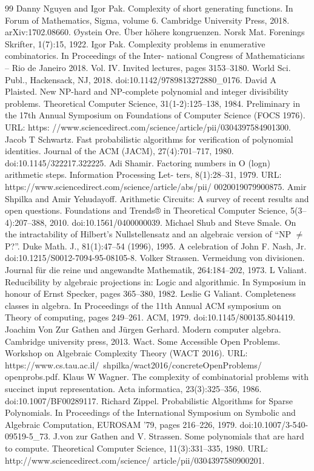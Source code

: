\documentclass[10pt,a4paper]{article}
\begin{document}
\begin{thebibliography}{99}
 Danny Nguyen and Igor Pak. Complexity of short generating functions. In Forum of Mathematics, Sigma, volume 6. Cambridge University Press, 2018. arXiv:1702.08660.
 Øystein Ore. Über höhere kongruenzen. Norsk Mat. Forenings Skrifter, 1(7):15, 1922.
 Igor Pak. Complexity problems in enumerative combinatorics. In Proceedings of the Inter- national Congress of Mathematicians – Rio de Janeiro 2018. Vol. IV. Invited lectures, pages 3153–3180. World Sci. Publ., Hackensack, NJ, 2018. doi:10.1142/9789813272880\_0176.
 David A Plaisted. New NP-hard and NP-complete polynomial and integer divisibility problems. Theoretical Computer Science, 31(1-2):125–138, 1984. Preliminary in the 17th Annual Symposium on Foundations of Computer Science (FOCS 1976). URL: https: //www.sciencedirect.com/science/article/pii/0304397584901300.
 Jacob T Schwartz. Fast probabilistic algorithms for verification of polynomial identities. Journal of the ACM (JACM), 27(4):701–717, 1980. doi:10.1145/322217.322225.
 Adi Shamir. Factoring numbers in O (logn) arithmetic steps. Information Processing Let- ters, 8(1):28–31, 1979. URL: https://www.sciencedirect.com/science/article/abs/pii/ 0020019079900875.
 Amir Shpilka and Amir Yehudayoff. Arithmetic Circuits: A survey of recent results and open questions. Foundations and Trends® in Theoretical Computer Science, 5(3–4):207–388, 2010. doi:10.1561/0400000039.
 Michael Shub and Steve Smale. On the intractability of Hilbert’s Nullstellensatz and an algebraic version of “NP $\neq$ P?”. Duke Math. J., 81(1):47–54 (1996), 1995. A celebration of John F. Nash, Jr. doi:10.1215/S0012-7094-95-08105-8.
 Volker Strassen. Vermeidung von divisionen. Journal für die reine und angewandte Mathematik, 264:184–202, 1973.
 L Valiant. Reducibility by algebraic projections in: Logic and algorithmic. In Symposium in honour of Ernst Specker, pages 365–380, 1982.
 Leslie G Valiant. Completeness classes in algebra. In Proceedings of the 11th Annual ACM symposium on Theory of computing, pages 249–261. ACM, 1979. doi:10.1145/800135.804419.
 Joachim Von Zur Gathen and Jürgen Gerhard. Modern computer algebra. Cambridge university press, 2013.
 Wact. Some Accessible Open Problems. Workshop on Algebraic Complexity Theory (WACT 2016).   URL: https://www.cs.tau.ac.il/~shpilka/wact2016/concreteOpenProblems/ openprobs.pdf.
 Klaus W Wagner. The complexity of combinatorial problems with succinct input representation. Acta informatica, 23(3):325–356, 1986. doi:10.1007/BF00289117.
 Richard Zippel. Probabilistic Algorithms for Sparse Polynomials. In Proceedings of the International Symposium on Symbolic and Algebraic Computation, EUROSAM ’79, pages 216–226, 1979. doi:10.1007/3-540-09519-5\_73.
 J.von zur Gathen and V. Strassen. Some polynomials that are hard to compute. Theoretical Computer Science, 11(3):331–335, 1980. URL: http://www.sciencedirect.com/science/ article/pii/0304397580900201.
\end{thebibliography}
\end{document}
